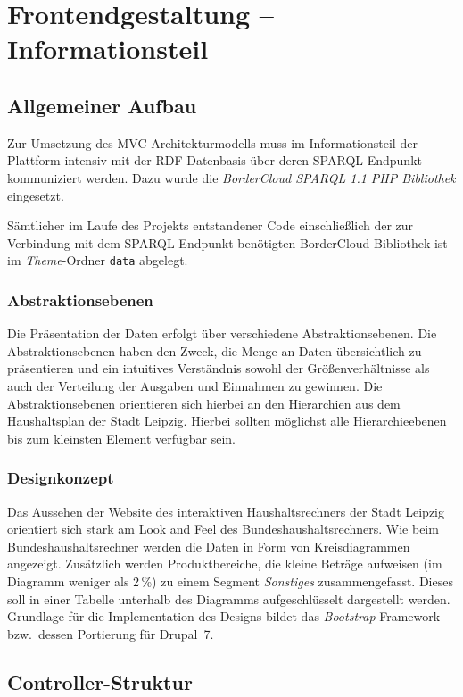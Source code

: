 \documentclass[a4paper,11pt,twoside]{article}
\begin{document}
\section{Frontendgestaltung -- Informationsteil}

\subsection{Allgemeiner Aufbau}

Zur Umsetzung des MVC-Architekturmodells muss im Informationsteil der
Plattform intensiv mit der RDF Datenbasis über deren SPARQL Endpunkt
kommuniziert werden. Dazu wurde die \emph{BorderCloud SPARQL 1.1 PHP
  Bibliothek} \cite{BorderCloud} eingesetzt.

Sämtlicher im Laufe des Projekts entstandener Code einschließlich der zur
Verbindung mit dem SPARQL-Endpunkt benötigten BorderCloud Bibliothek ist im
\emph{Theme}-Ordner \texttt{data} abgelegt.

\subsubsection*{Abstraktionsebenen}
Die Präsentation der Daten erfolgt über verschiedene Abstraktionsebenen. Die
Abstraktionsebenen haben den Zweck, die Menge an Daten übersichtlich zu
präsentieren und ein intuitives Verständnis sowohl der Größenverhältnisse als
auch der Verteilung der Ausgaben und Einnahmen zu gewinnen. Die
Abstraktionsebenen orientieren sich hierbei an den Hierarchien aus dem
Haushaltsplan der Stadt Leipzig. Hierbei sollten möglichst alle
Hierarchieebenen bis zum kleinsten Element verfügbar sein.

\subsubsection*{Designkonzept}
Das Aussehen der Website des interaktiven Haushaltsrechners der Stadt Leipzig
orientiert sich stark am Look and Feel des Bundeshaushaltsrechners. Wie beim
Bundeshaushaltsrechner werden die Daten in Form von Kreisdiagrammen
angezeigt. Zusätzlich werden Produktbereiche, die kleine Beträge aufweisen (im
Diagramm weniger als 2\,\%) zu einem Segment \textit{Sonstiges}
zusammengefasst.  Dieses soll in einer Tabelle unterhalb des Diagramms
aufgeschlüsselt dargestellt werden. Grundlage für die Implementation des
Designs bildet das \textit{Bootstrap}-Framework \cite{Bootstrap} bzw.\ dessen
Portierung für Drupal~7.

\subsection{Controller-Struktur}
\end{document}
